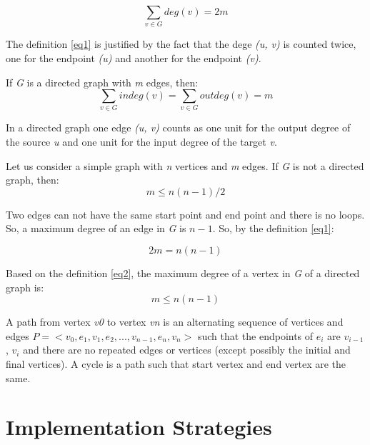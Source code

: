 \documentclass[a4paper]{article}
\begin{document}
    \begin{equation} \label{eq1}
        \sum_{v \in G} deg(v) = 2m
    \end{equation}

    The definition \ref{eq1} is justified by the fact that the dege
    \emph{(u, v)} is counted twice, one for the endpoint \emph{(u)} and
    another for the endpoint \emph{(v)}.

    If \emph{G} is a directed graph with \emph{m} edges, then:
    \begin{equation} \label{eq2}
        \sum_{v \in G} indeg(v) = \sum_{v \in G} outdeg(v) = m
    \end{equation}

    In a directed graph one edge \emph{(u, v)} counts as one unit
    for the output degree of the source \emph{u} and one unit for
    the input degree of the target \emph{v}.

    Let us consider a simple graph with \emph{n} vertices and \emph{m}
    edges. If \emph{G} is not a directed graph, then:
    \begin{equation} \label{eq3}
        m \le n(n - 1) / 2
    \end{equation}

    Two edges can not have the same start point and end point and there
    is no loops. So, a maximum degree of an edge in \emph{G} is $n - 1$.
    So, by the definition \ref{eq1}:

    \begin{equation} \label{eq4}
        2m = n(n - 1)
    \end{equation}

    Based on the definition \ref{eq2}, the maximum degree of a vertex in \emph{G}
    of a directed graph is:
    \begin{equation}
        m \le n(n-1)
    \end{equation}

    A path from vertex \emph{v0} to vertex \emph{vn} is an alternating sequence of
    vertices and edges $ P =< v_0, e_1, v_1, e_2, ..., v_{n-1}, e_n, v_n > $
    such that the endpoints of $ e_i $ are $ v_{i-1} $, $ v_i $ and there are no
    repeated edges or vertices (except possibly the initial and final vertices).
    A cycle is a path such that start vertex and end vertex are the same.

    \section{Implementation Strategies}
\end{document}
